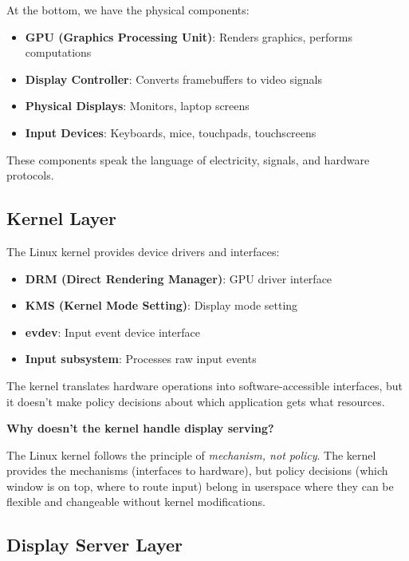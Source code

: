 At the bottom, we have the physical components:

\begin{itemize}[leftmargin=*]
    \item \textbf{GPU (Graphics Processing Unit)}: Renders graphics, performs computations
    \item \textbf{Display Controller}: Converts framebuffers to video signals
    \item \textbf{Physical Displays}: Monitors, laptop screens
    \item \textbf{Input Devices}: Keyboards, mice, touchpads, touchscreens
\end{itemize}

These components speak the language of electricity, signals, and hardware protocols.

\subsection{Kernel Layer}

The Linux kernel provides device drivers and interfaces:

\begin{itemize}[leftmargin=*]
    \item \textbf{DRM (Direct Rendering Manager)}: GPU driver interface
    \item \textbf{KMS (Kernel Mode Setting)}: Display mode setting
    \item \textbf{evdev}: Input event device interface
    \item \textbf{Input subsystem}: Processes raw input events
\end{itemize}

The kernel translates hardware operations into software-accessible interfaces, but it doesn't make policy decisions about which application gets what resources.

\begin{notebox}
\textbf{Why doesn't the kernel handle display serving?}

The Linux kernel follows the principle of \textit{mechanism, not policy}. The kernel provides the mechanisms (interfaces to hardware), but policy decisions (which window is on top, where to route input) belong in userspace where they can be flexible and changeable without kernel modifications.
\end{notebox}

\subsection{Display Server Layer}

